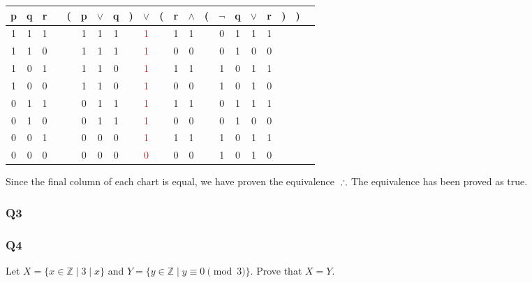 \documentclass{article}
\begin{document}
\begin{tabular}{@{ }c@{ }@{ }c@{ }@{ }c | c@{ }@{}c@{}@{ }c@{ }@{ }c@{ }@{ }c@{ }@{}c@{}@{ }c@{ }@{}c@{}@{ }c@{ }@{ }c@{ }@{}c@{}@{ }c@{ }@{ }c@{ }@{ }c@{ }@{ }c@{ }@{}c@{}@{}c@{}@{ }c}
p & q & r &  & ( & p & $\lor$ & q & ) & $\lor$ & ( & r & $\land$ & ( & $\lnot$ & q & $\lor$ & r & ) & ) & \\
\hline 
1 & 1 & 1 &  &  & 1 & 1 & 1 &  & \textcolor{red}{1} &  & 1 & 1 &  & 0 & 1 & 1 & 1 &  &  & \\
1 & 1 & 0 &  &  & 1 & 1 & 1 &  & \textcolor{red}{1} &  & 0 & 0 &  & 0 & 1 & 0 & 0 &  &  & \\
1 & 0 & 1 &  &  & 1 & 1 & 0 &  & \textcolor{red}{1} &  & 1 & 1 &  & 1 & 0 & 1 & 1 &  &  & \\
1 & 0 & 0 &  &  & 1 & 1 & 0 &  & \textcolor{red}{1} &  & 0 & 0 &  & 1 & 0 & 1 & 0 &  &  & \\
0 & 1 & 1 &  &  & 0 & 1 & 1 &  & \textcolor{red}{1} &  & 1 & 1 &  & 0 & 1 & 1 & 1 &  &  & \\
0 & 1 & 0 &  &  & 0 & 1 & 1 &  & \textcolor{red}{1} &  & 0 & 0 &  & 0 & 1 & 0 & 0 &  &  & \\
0 & 0 & 1 &  &  & 0 & 0 & 0 &  & \textcolor{red}{1} &  & 1 & 1 &  & 1 & 0 & 1 & 1 &  &  & \\
0 & 0 & 0 &  &  & 0 & 0 & 0 &  & \textcolor{red}{0} &  & 0 & 0 &  & 1 & 0 & 1 & 0 &  &  & \\
\end{tabular} \newline
Since the final column of each chart is equal, we have proven the equivalence
$\\\therefore$ The equivalence has been proved as true. 

\subsubsection{Q3}
\subsubsection{Q4}
Let $X = \{x \in \mathbb{Z} \mid 3 \mid x\}$ and $Y = \{y \in \mathbb{Z} \mid y \equiv 0\pmod{3}\}$. Prove that $X = Y$.
\end{document}
